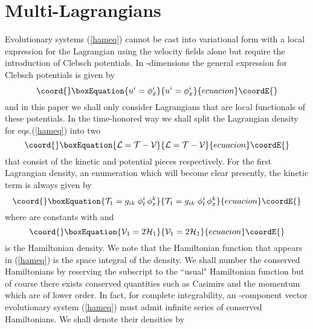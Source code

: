 \documentclass[a4paper,12pt]{article}
\begin{document}
\section{Multi-Lagrangians}
\label{sec-main}

Evolutionary systems (\ref{hameq}) cannot be cast into variational
form with a local expression for the Lagrangian using the velocity
fields \coordHE{} alone but require the introduction of Clebsch
potentials. In \coordHE{}-dimensions the general expression for Clebsch
potentials is given by
\begin{equation}\coord{}\boxEquation{
u^i =  \phi^i_x
\label{clebsch}
}{
u^i =  \phi^i_x
}{ecuacion}\coordE{}\end{equation}
and in this paper we shall only consider Lagrangians that are
local functionals of these potentials. In the time-honored way we
shall split the Lagrangian density for eqs.(\ref{hameq}) into two
\begin{equation}\coord{}\boxEquation{
{\cal L} =  {\cal T} - {\cal V} \label{lagtot}
}{
{\cal L} =  {\cal T} - {\cal V} }{ecuacion}\coordE{}\end{equation}
that consist of the kinetic and potential pieces respectively. For
the first Lagrangian density, an enumeration which will become
clear presently, the kinetic term is always given by
\begin{equation}\coord{}\boxEquation{
{\cal T}_{1} = g_{ik} \;  \phi^i_t \, \phi^k_x \label{kinetic}
}{
{\cal T}_{1} = g_{ik} \;  \phi^i_t \, \phi^k_x }{ecuacion}\coordE{}\end{equation}
where \coordHE{} are constants with \coordHE{} and
\begin{equation}\coord{}\boxEquation{
{\cal V}_{1} = 2 {\cal H}_1 \label{potential}
}{
{\cal V}_{1} = 2 {\cal H}_1 }{ecuacion}\coordE{}\end{equation}
is the Hamiltonian density. We note that the Hamiltonian function
that appears in (\ref{hameq}) is the space integral of the
density. We shall number the conserved Hamiltonians by reserving
the subscript \coordHE{} to the ``usual" Hamiltonian function but of
course there exists conserved quantities such as Casimirs and the
momentum which are of lower order. In fact, for complete
integrability, an \coordHE{}-component vector evolutionary system
(\ref{hameq}) must admit \coordHE{} infinite series of conserved
Hamiltonians. We shall denote their densities by
\end{document}
